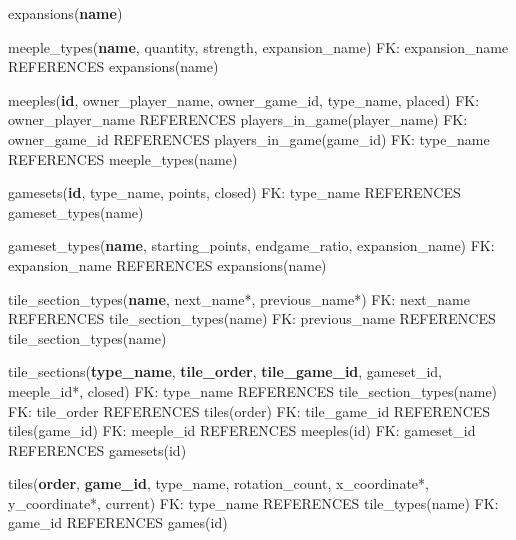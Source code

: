 expansions(\textbf{name})\newline

meeple\_types(\textbf{name}, quantity, strength, expansion\_name)\newline
FK: expansion\_name REFERENCES expansions(name)\newline

meeples(\textbf{id}, owner\_player\_name, owner\_game\_id, type\_name, placed)\newline
FK: owner\_player\_name REFERENCES players\_in\_game(player\_name)\newline
FK: owner\_game\_id REFERENCES players\_in\_game(game\_id)\newline
FK: type\_name REFERENCES meeple\_types(name)\newline

gamesets(\textbf{id}, type\_name, points, closed)\newline
FK: type\_name REFERENCES gameset\_types(name)\newline

gameset\_types(\textbf{name}, starting\_points, endgame\_ratio, expansion\_name)\newline
FK: expansion\_name REFERENCES expansions(name)\newline

tile\_section\_types(\textbf{name}, next\_name*, previous\_name*)\newline
FK: next\_name REFERENCES tile\_section\_types(name)\newline
FK: previous\_name REFERENCES tile\_section\_types(name)\newline

tile\_sections(\textbf{type\_name}, \textbf{tile\_order}, \textbf{tile\_game\_id}, gameset\_id, meeple\_id*, closed)\newline
FK: type\_name REFERENCES tile\_section\_types(name)\newline
FK: tile\_order REFERENCES tiles(order)\newline
FK: tile\_game\_id REFERENCES tiles(game\_id)\newline
FK: meeple\_id REFERENCES meeples(id)\newline
FK: gameset\_id REFERENCES gamesets(id)\newline

tiles(\textbf{order}, \textbf{game\_id}, type\_name, rotation\_count, x\_coordinate*, y\_coordinate*, current)\newline
FK: type\_name REFERENCES tile\_types(name)\newline
FK: game\_id REFERENCES games(id)\newline


